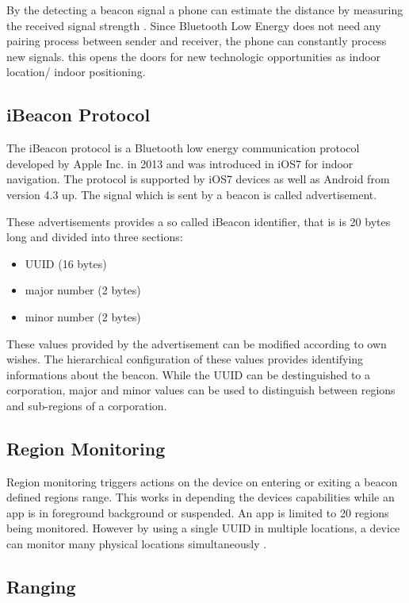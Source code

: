 By the detecting a beacon signal a phone can estimate the distance by measuring the received signal strength \cite{developerDocsEstimote}. Since Bluetooth Low Energy does not need any pairing process between sender and receiver, the phone can constantly process new signals. this opens the doors for new technologic opportunities as indoor location/ indoor positioning.


\subsection{iBeacon Protocol}

The iBeacon protocol is a Bluetooth low energy communication protocol developed by Apple Inc. in 2013 and was introduced in iOS7 for indoor navigation. The protocol is supported by iOS7 devices as well as Android from version 4.3 up. The signal which is sent by a beacon is called advertisement.

These advertisements provides a so called iBeacon identifier, that is is 20 bytes long and divided into three sections:

\begin{itemize}
    \item UUID (16 bytes)
    \item major number (2 bytes)
    \item minor number (2 bytes)
\end{itemize}

These values provided by the advertisement can be modified according to own wishes.
The hierarchical configuration of these values provides identifying informations about the beacon. While the UUID can be destinguished to a corporation, major and minor values can be used to distinguish between regions and sub-regions of a corporation.


\subsection{Region Monitoring}

Region monitoring triggers actions on the device on entering or exiting a beacon defined regions range. This works in depending the devices capabilities while an app is in foreground background or suspended. An app is limited to 20 regions being monitored. However by using a single UUID in multiple locations, a device can monitor many physical locations simultaneously \cite{appleIBeacon}.


\subsection{Ranging}

